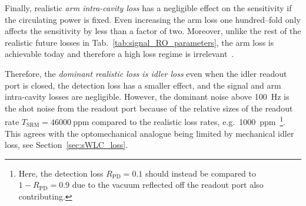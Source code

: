Finally, realistic \emph{arm intra-cavity loss} has a negligible effect on the sensitivity if the circulating power is fixed. Even increasing the arm loss one hundred--fold only affects the sensitivity by less than a factor of two. Moreover, unlike the rest of the realistic future losses in Tab.~\ref{tab:signal_RO_parameters}, the arm loss is achievable today and therefore a high loss regime is irrelevant~\cite{hardwick_2019,zhangBroadbandSignalRecycling2021}. %

Therefore, the \emph{dominant realistic loss is idler loss} even when the idler readout port is closed, the detection loss has a smaller effect, and the signal and arm intra-cavity losses are negligible. However, the dominant noise above 100~Hz is the shot noise from the readout port because of the relative sizes of the readout rate $T_\text{SRM}=46000~\text{ppm}$ compared to the realistic loss rates, e.g.\ 1000~ppm~\footnote{Here, the detection loss $R_\text{PD}=0.1$ should instead be compared to $1-R_\text{PD}=0.9$ due to the vacuum reflected off the readout port also contributing.}. This agrees with the optomechanical analogue being limited by mechanical idler loss, see Section~\ref{sec:sWLC_loss}. 

